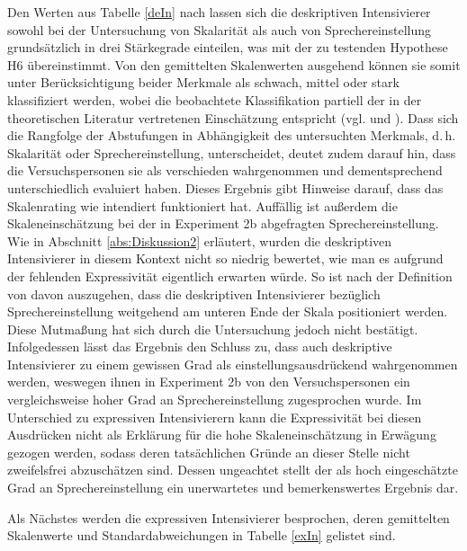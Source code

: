\noindent Den Werten aus Tabelle \ref{deIn} nach lassen sich die deskriptiven Intensivierer sowohl bei der Untersuchung von Skalarität als auch von Sprechereinstellung grundsätzlich in drei Stärkegrade einteilen, was mit der zu testenden {Hypothese H6} übereinstimmt. Von den gemittelten Skalenwerten ausgehend können sie somit unter Berücksichtigung beider Merkmale als schwach, mittel oder stark klassifiziert werden, wobei die beobachtete Klassifikation partiell der in der theoretischen Literatur vertretenen Einschätzung entspricht (vgl. {\citealt[87]{Biedermann.1969}} und \citealt[408]{Breindl.2007}). Dass sich die Rangfolge der Abstufungen in Abhängigkeit des untersuchten Merkmals, d.\,h. Skalarität oder Sprechereinstellung, unterscheidet, deutet zudem darauf hin, dass die Versuchspersonen sie als verschieden wahrgenommen und dementsprechend unterschiedlich evaluiert haben. Dieses Ergebnis gibt Hinweise darauf, dass das Skalenrating wie intendiert funktioniert hat. Auffällig ist außerdem die Skaleneinschätzung bei der in Experiment 2b abgefragten Sprechereinstellung. Wie in {Abschnitt \ref{abs:Diskussion2}} erläutert, wurden die deskriptiven Intensivierer in diesem Kontext nicht so niedrig bewertet, wie man es aufgrund der fehlenden Expressivität eigentlich erwarten würde. So ist nach der Definition von {\citet[133]{Gutzmann.2019a}} davon auszugehen, dass die deskriptiven Intensivierer bezüglich Sprechereinstellung weitgehend am unteren Ende der Skala positioniert werden. Diese Mutmaßung hat sich durch die Untersuchung jedoch nicht bestätigt. Infolgedessen lässt das Ergebnis den Schluss zu, dass auch deskriptive Intensivierer zu einem gewissen Grad als einstellungsausdrückend wahrgenommen werden, weswegen ihnen in {Experiment 2b} von den Versuchspersonen ein vergleichsweise hoher Grad an Sprechereinstellung zugesprochen wurde. Im Unterschied zu expressiven Intensivierern kann die Expressivität bei diesen Ausdrücken nicht als Erklärung für die hohe Skaleneinschätzung in Erwägung gezogen werden, sodass deren tatsächlichen Gründe an dieser Stelle nicht zweifelsfrei abzuschätzen sind. Dessen ungeachtet stellt der als hoch eingeschätzte Grad an Sprechereinstellung ein unerwartetes und bemerkenswertes Ergebnis dar.


Als Nächstes werden die expressiven Intensivierer besprochen, deren gemittelten Skalenwerte und Standardabweichungen in {Tabelle \ref{exIn} gelistet sind.}




